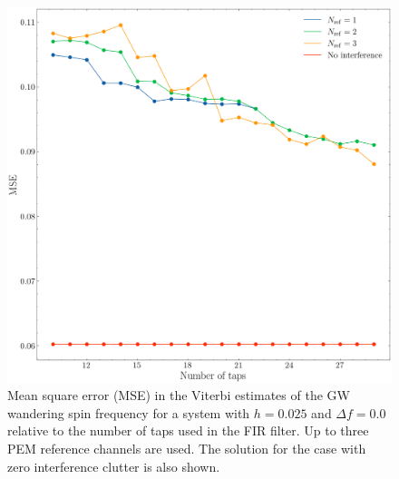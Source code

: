 \documentclass[pra,superscriptaddress,reprint,amsmath,amssymb,nofootinbib]{revtex4-2}
\begin{document}
\begin{table}
	\centering
		\caption{Summary of AUC values for each of the ROC curves presented in Figure \ref{fig:4C_roccurve_multi_ref}. Adding an extra PEM reference generally improves the detection performance, with the exception of system B. The AUC value for the zero PEM reference case (i.e. no ANC filtering) is $\text{AUC} = 0.55$.}
		\label{tab:AUC}
	\end{table}

\begin{figure}
	\begin{center}
		\includegraphics[width=\columnwidth]{images/taps_vs_error}
	\end{center}
	\caption{Mean square error (MSE) in the Viterbi estimates of the GW wandering spin frequency for a system with $h=0.025$ and $\Delta f =0.0$ relative to the number of taps used in the FIR filter. Up to three PEM reference channels are used. The solution for the case with zero interference clutter is also shown.}
	\label{fig:filterorder2}
\end{figure}
\end{document}
